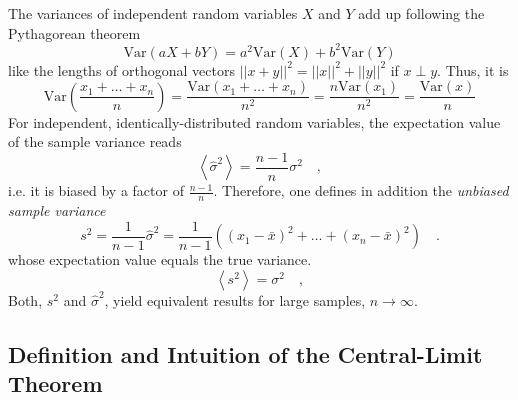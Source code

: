 \documentclass{notebook}
\begin{document}
The variances of independent random variables $X$ and $Y$ add up following the Pythagorean theorem
%
\begin{equation}
\text{Var}(aX + bY) = a^2 \text{Var}(X) + b^2 \text{Var}(Y)
\end{equation}
%
like the lengths of orthogonal vectors  $||x + y||^2 = ||x||^2 + ||y||^2$ if $x \perp y$. Thus, it is 
%
\begin{equation}
\text{Var}\left(\frac{x_1 + \dots + x_n}{n}\right) = \frac{\text{Var}(x_1 + \dots + x_n)}{n^2} = \frac{n \text{Var}(x_1)}{n^2} = \frac{\text{Var}(x)}{n}
\end{equation}
%
For independent, identically-distributed random variables, the expectation value of the sample variance reads
%
\begin{equation}
	\left\langle \widehat{\sigma}^2 \right\rangle = \frac{n-1}{n} \sigma^2 \quad,
\end{equation}
%
i.e. it is biased by a factor of $\frac{n-1}{n}$. Therefore, one defines in addition the \textit{unbiased sample variance}
%
\begin{equation}
	s^2 = \frac{1}{n-1} \widehat{\sigma}^2 = \frac{1}{n-1} \left(
	\left(x_1-\bar{x}\right)^2  + \dots + \left(x_n-\bar{x}\right)^2
	\right) \quad.
\end{equation}
%
whose expectation value equals the true variance. 
%
\begin{equation}
	\left\langle s^2 \right\rangle = \sigma^2 \quad,
\end{equation}
%
Both, $s^2$ and $\widehat{\sigma}^2$, yield equivalent results for large samples, $n \to \infty$. 

\subsection*{Definition and Intuition of the Central-Limit Theorem}
\end{document}
